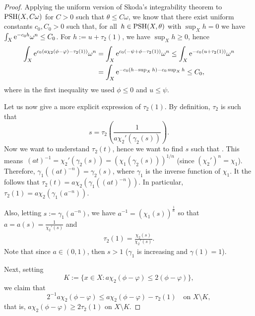 \documentclass[pdftex]{sigma}
\numberwithin{equation}{section}
\theoremstyle{plain}
\newcommand \PSH {{\rm PSH}}
\begin{document}
\begin{proof}
Applying the uniform version of Skoda's integrability theorem \cite{Zer01} to $\PSH(X,C\omega)$ for ${C>0}$ such that $\theta\leq C\omega$, we know that there exist uniform constants $c_0, C_0>0$ such that, for all~${h \in \PSH(X,\theta)}$ with $\sup_X h=0$ we have $\int_X {\rm e}^{-c_0 h} \omega^n \leq C_0$. For $h:=u+\tau_2(1)$, we have $\sup_X h \geq 0$, hence
\begin{align*}%
 \int_X {\rm e}^{c_0 (a \chi_2(\phi-\varphi) -\tau_2(1))} \omega^n &= \int_X {\rm e}^{c_0 (-\psi+\phi -\tau_2(1))} \omega^n \leq \int_X {\rm e}^{-c_0 (u +\tau_2(1))} \omega^n
\\&= \int_X {\rm e}^{-c_0 (h-\sup_X h) - c_0\sup_X h} \leq C_0,
\end{align*}
where in the first inequality we used $\phi\leq 0$ and $u\leq \psi$.

Let us now give a more explicit expression of $\tau_2(1)$.
By definition, $\tau_2$ is such that
\[s=\tau_2 \left( \frac{1}{a\chi_2'(\gamma_2(s))} \right).\] Now we want to understand $\tau_2(t)$, hence we want to find $s$ such that . This means~${ (at)^{-1}=\chi_2'(\gamma_2(s)) = (\chi_1(\gamma_2(s)))^{1/n} }$ (since $(\chi_2')^n=\chi_1$). Therefore, $\gamma_1((at)^{-n}) =\gamma_2(s)$, where $\gamma_1$ is the inverse function of $\chi_1$. It the follows that $ \tau_2(t)= a\chi_2(\gamma_1((at)^{-n}))$.
In particular, $\tau_2(1)= a\chi_2(\gamma_1(a^{-n}))$.

Also, letting $s:=\gamma_1 (a^{-n})$, we have $a^{-1} = (\chi_1(s))^{\frac{1}{n}}$ so that $a=a(s) = \frac{1}{\chi_2'(s)}$ and
\begin{gather} \tau_2(1) = \frac{\chi_2(s)}{\chi_2'(s)}. \label{Bo} \end{gather}
Note that since $a\in(0,1)$, then $s > 1$ ($\gamma_1$ is increasing and $\gamma(1)=1$).

Next, setting \[K:= \{ x \in X \colon a \chi_2(\phi - \varphi) \leq 2(\phi - \varphi) \},\]
we claim that
\[2^{-1} a \chi_2(\phi - \varphi) \leq a \chi_2(\phi - \varphi) - \tau_2(1) \quad \text{on $X \setminus K$},\]
that is, $a \chi_2(\phi - \varphi) \geq 2 \tau_2(1)$ on $X \setminus K$.


\end{proof}
\end{document}
